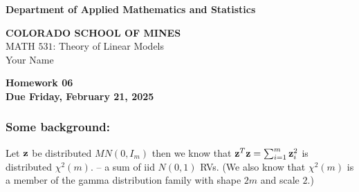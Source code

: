 \documentclass[12pt]{article}
\begin{document}
\begin{flushleft}

\textbf{Department of Applied Mathematics and Statistics}

\textbf{COLORADO SCHOOL OF MINES}\\


MATH $531$: Theory of Linear Models \\
Your Name
\end{flushleft}

\vspace{0.1in}

\begin{center}
{\bf Homework 06} \\
{\bf Due Friday, February 21, 2025} \\
\end{center}

\vspace{0.1in}
\subsubsection*{Some background: }
Let $\mathbf{z}$ be distributed $MN(0,I_m)$ then we know that $\mathbf{z}^T \mathbf{z} = \sum_{i=1}^m \mathbf{z}_i^2$ is distributed $\chi^2(m)$.  -- a sum of iid $N(0,1)$ RVs. 
  (We also know that $\chi^2(m)$ is a member of the gamma distribution family with shape $2m$ and scale $2$.)
\end{document}
